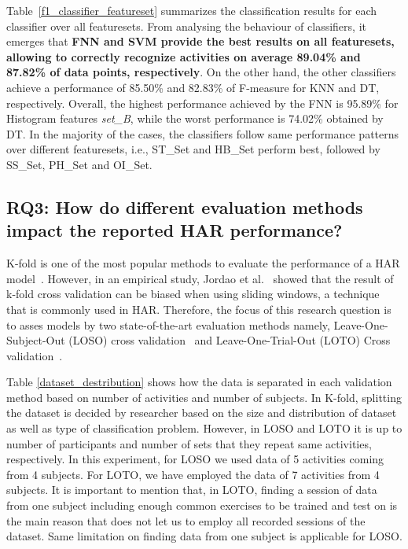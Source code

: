 \documentclass[journal,article,submit,moreauthors,pdftex]{Definitions/mdpi}
\begin{document}
Table~\ref{f1_classifier_featureset} summarizes the classification results for each classifier over all featuresets.  From analysing the behaviour of classifiers, it emerges that \textbf{FNN and SVM provide the best results on all featuresets, allowing to correctly recognize activities on average 89.04\% and 87.82\% of data points, respectively}. On the other hand, the other classifiers achieve a performance of 85.50\% and 82.83\% of F-measure for KNN and DT, respectively. Overall, the highest performance achieved by the FNN is 95.89\% for Histogram features \textit{set\_B}, while the worst performance is 74.02\% obtained by DT. In the majority of the cases, the classifiers follow same performance patterns over different featuresets, i.e., ST\_Set and HB\_Set perform best, followed by SS\_Set, PH\_Set and OI\_Set. 


\subsection{RQ3: How do different evaluation methods impact the reported HAR performance?}

K-fold is one of the most popular methods to evaluate the performance of a HAR model~\cite{wang2019survey}. However, in an empirical study, Jordao et al.~\cite{jordao2018human} showed that the result of k-fold cross validation can be biased when using sliding windows, a technique that is commonly used in HAR. Therefore, the focus of this research question is to asses models by two state-of-the-art evaluation methods namely, Leave-One-Subject-Out (LOSO) cross validation~\cite{liu2011multisensor} and Leave-One-Trial-Out (LOTO) Cross validation~\cite{sena2018multiscale,jordao2018human}. 

Table \ref{dataset_destribution} shows how the data is separated in each validation method based on number of activities and number of subjects. In K-fold, splitting the dataset is decided by researcher based on the size and distribution of dataset as well as type of classification problem\cite{jordao2018human}. However, in LOSO and LOTO it is up to number of participants and number of sets that they repeat same activities, respectively. In this experiment, for LOSO we used data of 5 activities coming from 4 subjects. For LOTO, we have employed the data of 7 activities from 4 subjects. It is important to mention that, in LOTO, finding a session of data from one subject including enough common exercises to be trained and test on is the main reason that does not let us to employ all recorded sessions of the dataset. Same limitation on finding data from one subject is applicable for LOSO.
\end{document}

